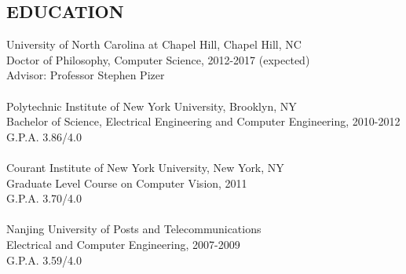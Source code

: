 \documentclass{res}
\begin{document}
 

\address{\bf E-MAIL \\ \texttt{cshao@cs.unc.edu}\\            \\ }    
\address{\bf  PRESENT ADDRESS\\425 Hillsborough ST, APT 6C\\Chapel Hill, NC 27514\\(919) 619-0326}

                                  
\begin{resume}

 
\section{EDUCATION}   
   \vspace{0.05in}
    University of North Carolina at Chapel Hill, Chapel Hill, NC\\        
    Doctor of Philosophy, Computer Science, 2012-2017 (expected) \\ 
    Advisor: Professor Stephen Pizer\\       
    \\           
    Polytechnic Institute of New York University,  Brooklyn, NY\\        
    Bachelor of Science, Electrical Engineering and Computer Engineering, 2010-2012 \\        
    G.P.A. 3.86/4.0 \\
    \\    
    Courant Institute of New York University, New York, NY\\
    Graduate Level Course on Computer Vision, 2011\\
    G.P.A. 3.70/4.0\\
    \\
    Nanjing University of Posts and Telecommunications\\
    Electrical and Computer Engineering, 2007-2009\\
    G.P.A. 3.59/4.0\\
 

\end{resume}
\end{document}
